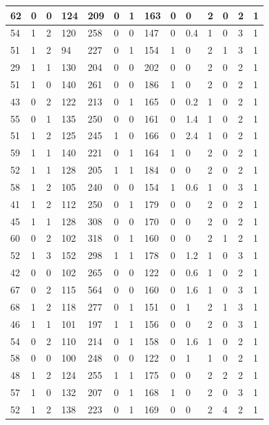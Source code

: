 \documentclass{article}
\begin{document}
\begin{table}[h!]
\begin{tabular}{|l|l|l|l|l|l|l|l|l|l|l|l|l|l|}
62 & 0 & 0 & 124 & 209 & 0 & 1 & 163 & 0 & 0 & 2  &0 & 2 & 1 \\ \hline
54 & 1 & 2 & 120 & 258 & 0 & 0 & 147 & 0 & 0.4 & 1  &0 & 3 & 1 \\ \hline
51 & 1 & 2 & 94 & 227 & 0 & 1 & 154 & 1 & 0 & 2  &1 & 3 & 1 \\ \hline
29 & 1 & 1 & 130 & 204 & 0 & 0 & 202 & 0 & 0 & 2  &0 & 2 & 1 \\ \hline
51 & 1 & 0 & 140 & 261 & 0 & 0 & 186 & 1 & 0 & 2  &0 & 2 & 1 \\ \hline
43 & 0 & 2 & 122 & 213 & 0 & 1 & 165 & 0 & 0.2 & 1  &0 & 2 & 1 \\ \hline
55 & 0 & 1 & 135 & 250 & 0 & 0 & 161 & 0 & 1.4 & 1  &0 & 2 & 1 \\ \hline
51 & 1 & 2 & 125 & 245 & 1 & 0 & 166 & 0 & 2.4 & 1  &0 & 2 & 1 \\ \hline
59 & 1 & 1 & 140 & 221 & 0 & 1 & 164 & 1 & 0 & 2  &0 & 2 & 1 \\ \hline
52 & 1 & 1 & 128 & 205 & 1 & 1 & 184 & 0 & 0 & 2  &0 & 2 & 1 \\ \hline
58 & 1 & 2 & 105 & 240 & 0 & 0 & 154 & 1 & 0.6 & 1  &0 & 3 & 1 \\ \hline
41 & 1 & 2 & 112 & 250 & 0 & 1 & 179 & 0 & 0 & 2  &0 & 2 & 1 \\ \hline
45 & 1 & 1 & 128 & 308 & 0 & 0 & 170 & 0 & 0 & 2  &0 & 2 & 1 \\ \hline
60 & 0 & 2 & 102 & 318 & 0 & 1 & 160 & 0 & 0 & 2  &1 & 2 & 1 \\ \hline
52 & 1 & 3 & 152 & 298 & 1 & 1 & 178 & 0 & 1.2 & 1  &0 & 3 & 1 \\ \hline
42 & 0 & 0 & 102 & 265 & 0 & 0 & 122 & 0 & 0.6 & 1  &0 & 2 & 1 \\ \hline
67 & 0 & 2 & 115 & 564 & 0 & 0 & 160 & 0 & 1.6 & 1  &0 & 3 & 1 \\ \hline
68 & 1 & 2 & 118 & 277 & 0 & 1 & 151 & 0 & 1 & 2  &1 & 3 & 1 \\ \hline
46 & 1 & 1 & 101 & 197 & 1 & 1 & 156 & 0 & 0 & 2  &0 & 3 & 1 \\ \hline
54 & 0 & 2 & 110 & 214 & 0 & 1 & 158 & 0 & 1.6 & 1  &0 & 2 & 1 \\ \hline
58 & 0 & 0 & 100 & 248 & 0 & 0 & 122 & 0 & 1 & 1  &0 & 2 & 1 \\ \hline
48 & 1 & 2 & 124 & 255 & 1 & 1 & 175 & 0 & 0 & 2  &2 & 2 & 1 \\ \hline
57 & 1 & 0 & 132 & 207 & 0 & 1 & 168 & 1 & 0 & 2  &0 & 3 & 1 \\ \hline
52 & 1 & 2 & 138 & 223 & 0 & 1 & 169 & 0 & 0 & 2  &4 & 2 & 1 \\ \hline

\end{tabular}
\end{table}
\end{document}
